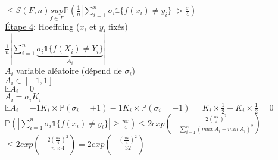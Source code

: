 \documentclass[a4paper]{report}
\begin{document}
$\leq \mathcal{S}(F,n) \underset{f\in F}{sup} \mathds{P}(\frac{1}{n}|\displaystyle {\sum_{i=1}^n}\sigma_i \mathds{1}\{f(x_i)\neq y_i\}|> \frac{\varepsilon}{4}) $\\
\newline
\underline{Étape 4}: Hoeffding ($x_i$ et $y_i$ fixés)\\
$\frac{1}{n}|\displaystyle {\sum_{i=1}^n}\underbrace{\sigma_i \mathds{1}\{f(X_i)\neq Y_i\}}_{A_i}|$\\
$A_i$ variable aléatoire (dépend de $\sigma_i$)\\
$A_i \in [-1, 1]$\\
$\mathds{E}A_i=0$\\
$A_i = \sigma_i K_i$\\
$\mathds{E}A_i = +1K_i \times \mathds{P}(\sigma_i=+1)-1K_i \times \mathds{P}(\sigma_i=-1)$ = $K_i \times \frac{1}{2}-K_i \times \frac{1}{2} = 0 $\\
\newline
$\mathds{P}(|\displaystyle {\sum_{i=1}^n}\sigma_i \mathds{1}\{f(x_i)\neq y_i\}|\geq \frac{n\varepsilon}{4})\leq 2exp(-\frac{2(\frac{n\varepsilon}{4})^2}{\displaystyle{\sum_{i=1}^n}(max\ A_i-min\ A_i)^2})$\\
$\leq 2exp(-\frac{2(\frac{n\varepsilon}{4})^2}{n\times4})= 2exp(-\frac{(\frac{n\varepsilon}{4})^2}{32})$\\
\end{document}
